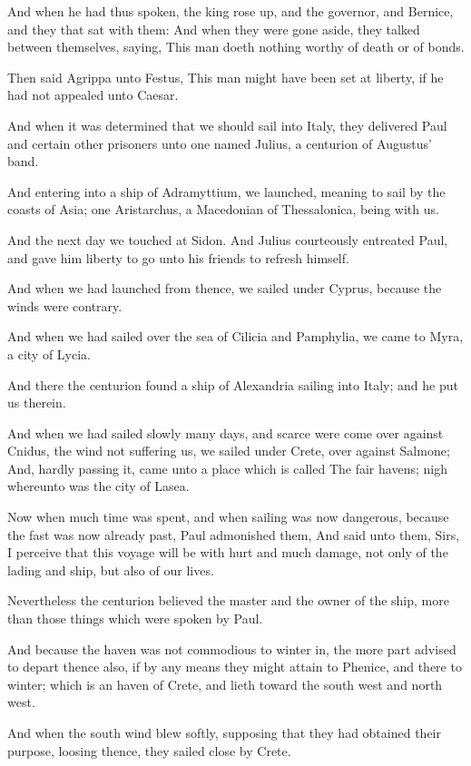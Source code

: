 \Verse And when he had thus spoken, the king rose up, and the governor, and Bernice, and they that sat with them: \Verse And when they were gone aside, they talked between themselves, saying, This man doeth nothing worthy of death or of bonds.

\Verse Then said Agrippa unto Festus, This man might have been set at liberty, if he had not appealed unto Caesar.


\Chapter
\Verse And when it was determined that we should sail into Italy, they delivered Paul and certain other prisoners unto one named Julius, a centurion of Augustus' band.

\Verse And entering into a ship of Adramyttium, we launched, meaning to sail by the coasts of Asia; one Aristarchus, a Macedonian of Thessalonica, being with us.

\Verse And the next day we touched at Sidon. And Julius courteously entreated Paul, and gave him liberty to go unto his friends to refresh himself.

\Verse And when we had launched from thence, we sailed under Cyprus, because the winds were contrary.

\Verse And when we had sailed over the sea of Cilicia and Pamphylia, we came to Myra, a city of Lycia.

\Verse And there the centurion found a ship of Alexandria sailing into Italy; and he put us therein.

\Verse And when we had sailed slowly many days, and scarce were come over against Cnidus, the wind not suffering us, we sailed under Crete, over against Salmone; \Verse And, hardly passing it, came unto a place which is called The fair havens; nigh whereunto was the city of Lasea.

\Verse Now when much time was spent, and when sailing was now dangerous, because the fast was now already past, Paul admonished them, \Verse And said unto them, Sirs, I perceive that this voyage will be with hurt and much damage, not only of the lading and ship, but also of our lives.

\Verse Nevertheless the centurion believed the master and the owner of the ship, more than those things which were spoken by Paul.

\Verse And because the haven was not commodious to winter in, the more part advised to depart thence also, if by any means they might attain to Phenice, and there to winter; which is an haven of Crete, and lieth toward the south west and north west.

\Verse And when the south wind blew softly, supposing that they had obtained their purpose, loosing thence, they sailed close by Crete.

